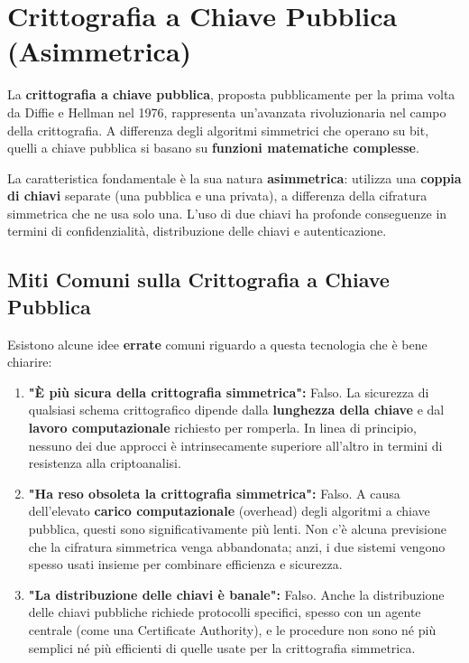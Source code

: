 \section{Crittografia a Chiave Pubblica (Asimmetrica)}

La \textbf{crittografia a chiave pubblica}, proposta pubblicamente per la prima volta da Diffie e Hellman nel 1976, rappresenta un'avanzata rivoluzionaria nel campo della crittografia. A differenza degli algoritmi simmetrici che operano su bit, quelli a chiave pubblica si basano su \textbf{funzioni matematiche complesse}.

La caratteristica fondamentale è la sua natura \textbf{asimmetrica}: utilizza una \textbf{coppia di chiavi} separate (una pubblica e una privata), a differenza della cifratura simmetrica che ne usa solo una. L'uso di due chiavi ha profonde conseguenze in termini di confidenzialità, distribuzione delle chiavi e autenticazione.

\subsection{Miti Comuni sulla Crittografia a Chiave Pubblica}
Esistono alcune idee \textbf{errate} comuni riguardo a questa tecnologia che è bene chiarire:

\begin{enumerate}
    \item \textbf{"È più sicura della crittografia simmetrica":} Falso. La sicurezza di qualsiasi schema crittografico dipende dalla \textbf{lunghezza della chiave} e dal \textbf{lavoro computazionale} richiesto per romperla. In linea di principio, nessuno dei due approcci è intrinsecamente superiore all'altro in termini di resistenza alla criptoanalisi.
    \item \textbf{"Ha reso obsoleta la crittografia simmetrica":} Falso. A causa dell'elevato \textbf{carico computazionale} (overhead) degli algoritmi a chiave pubblica, questi sono significativamente più lenti. Non c'è alcuna previsione che la cifratura simmetrica venga abbandonata; anzi, i due sistemi vengono spesso usati insieme per combinare efficienza e sicurezza.
    \item \textbf{"La distribuzione delle chiavi è banale":} Falso. Anche la distribuzione delle chiavi pubbliche richiede protocolli specifici, spesso con un agente centrale (come una Certificate Authority), e le procedure non sono né più semplici né più efficienti di quelle usate per la crittografia simmetrica.
\end{enumerate}

